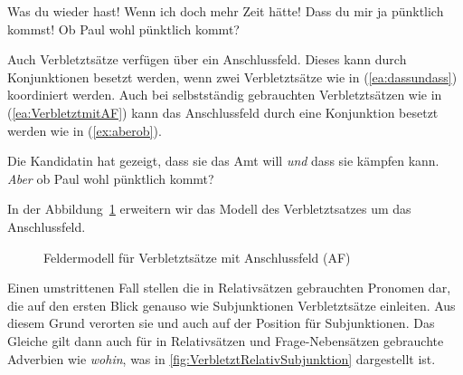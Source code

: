 \ea \label{ea:VerbletztmitAF}
\ea \label{ea:VerbletztAusruf} Was du wieder hast!
\ex \label{ex:VerbletztWunsch} Wenn ich doch mehr Zeit hätte!
\ex \label{ex:VerbletztAufforderung} Dass du mir ja pünktlich kommst!
\ex \label{ex:VerbletztEntscheidungsfrage} Ob Paul wohl pünktlich kommt?
\z
\z 

Auch Verbletztsätze verfügen über ein Anschlussfeld. Dieses kann durch Konjunktionen besetzt werden, \zB wenn zwei Verbletztsätze wie in (\ref{ea:dassundass}) koordiniert werden. Auch bei selbstständig gebrauchten Verbletztsätzen wie in (\ref{ea:VerbletztmitAF}) kann das Anschlussfeld durch eine Konjunktion besetzt werden wie in (\ref{ex:aberob}).

\ea
\ea \label{ea:dassundass} Die Kandidatin hat gezeigt, dass sie das Amt will \textit{und} dass sie kämpfen kann. 
\ex \label{ex:aberob} \textit{Aber} ob Paul wohl pünktlich kommt?
\z 
\z 

In der Abbildung~\ref{fig:VerbletztfeldermitAF} erweitern wir das Modell des Verbletztsatzes um das Anschlussfeld.

\begin{figure}[!htbp]
  \centering
  \caption{Feldermodell für Verbletztsätze mit Anschlussfeld (AF)}
  \label{fig:VerbletztfeldermitAF}
\end{figure}

Einen umstrittenen Fall stellen die in Relativsätzen gebrauchten Pronomen dar, die auf den ersten Blick genauso wie Subjunktionen Verbletztsätze einleiten. Aus diesem Grund verorten sie \citet[280]{Hoehle19862018} und \citet[414]{Eisenberg2020_Satz} auch auf der Position für Subjunktionen. Das Gleiche gilt dann auch für in Relativsätzen und Frage-Nebensätzen gebrauchte Adverbien wie \textit{wohin}, was in \ref{fig:VerbletztRelativSubjunktion} dargestellt ist. 


